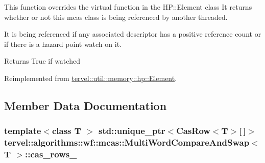 This function overrides the virtual function in the H\+P\+::\+Element class It returns whether or not this mcas class is being referenced by another threaded. 

It is being referenced if any associated descriptor has a positive reference count or if there is a hazard point watch on it.

\begin{DoxyReturn}{Returns}
True if watched 
\end{DoxyReturn}


Reimplemented from \hyperlink{classtervel_1_1util_1_1memory_1_1hp_1_1_element_a88306bc6b64d0110e3ee568514dbcc04}{tervel\+::util\+::memory\+::hp\+::\+Element}.



\subsection{Member Data Documentation}
\hypertarget{classtervel_1_1algorithms_1_1wf_1_1mcas_1_1_multi_word_compare_and_swap_aa8be0b396445ce9d7e022aaab4acbaff}{}
\subsubsection[{cas\+\_\+rows\+\_\+}]{\setlength{\rightskip}{0pt plus 5cm}template$<$class T $>$ std\+::unique\+\_\+ptr$<${\bf Cas\+Row}$<$T$>$\mbox{[}$\,$\mbox{]}$>$ {\bf tervel\+::algorithms\+::wf\+::mcas\+::\+Multi\+Word\+Compare\+And\+Swap}$<$ T $>$\+::cas\+\_\+rows\+\_\+\hspace{0.3cm}{\ttfamily [private]}}\label{classtervel_1_1algorithms_1_1wf_1_1mcas_1_1_multi_word_compare_and_swap_aa8be0b396445ce9d7e022aaab4acbaff}
\hypertarget{classtervel_1_1algorithms_1_1wf_1_1mcas_1_1_multi_word_compare_and_swap_a330cbacbf84e4c22631cc35b28b0bed4}{}
